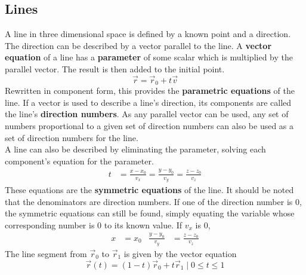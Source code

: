 \documentclass[../Calculus_\Roman{3}]{subfiles}
\begin{document}
					\subsection*{Lines}
						A line in three dimensional space is defined by a known point and a direction. The direction can be described by a vector parallel to the line. A \textbf{vector equation} of a line has a \textbf{parameter} of some scalar which is multiplied by the parallel vector. The result is then added to the initial point.
						\[\vec{r} = \vec{r}_0 + t\vec{v}\]
						Rewritten in component form, this provides the \textbf{parametric equations} of the line.
						If a vector is used to describe a line's direction, its components are called the line's \textbf{direction numbers}. As any parallel vector can be used, any set of numbers proportional to a given set of direction numbers can also be used as a set of direction numbers for the line. \\
						A line can also be described by eliminating the parameter, solving each component's equation for the parameter.\
						\begin{align*}
							t &= \frac{x - x_0}{v_x} = \frac{y - y_0}{v_y} = \frac{z - z_0}{v_z}
						\end{align*}
						These equations are the \textbf{symmetric equations} of the line. It should be noted that the denominators are direction numbers. If one of the direction number is 0, the symmetric equations can still be found, simply equating the variable whose corresponding number is 0 to its known value. If $v_x$ is 0,
							\begin{align*}
								x &= x_0 & \frac{y - y_0}{v_y} &= \frac{z - z_0}{v_z}
							\end{align*}
						The line segment from $\vec{r}_0$ to $\vec{r}_1$ is given by the vector equation
							\[\vec{r}(t) = (1 - t)\vec{r}_0 + t\vec{r}_1 \mid 0 \le t \le 1\]
\end{document}
